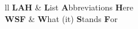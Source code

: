 \begin{abbreviations}{ll} %
\textbf{LAH} & \textbf{L}ist \textbf{A}bbreviations \textbf{H}ere\\
\textbf{WSF} & \textbf{W}hat (it) \textbf{S}tands \textbf{F}or\\

\end{abbreviations}
